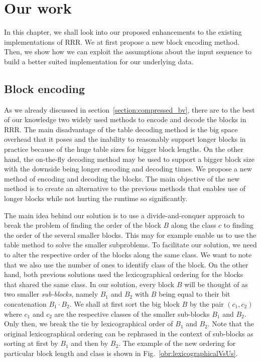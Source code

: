 \chapter{Our work}
\label{kap:kap3}

In this chapter, we shall look into our proposed enhancements to the existing
implementations of RRR. We at first propose a new block encoding method.
Then, we show how we can exploit the assumptions about the input sequence to
build a better suited implementation for our underlying data. 

\section{Block encoding}

As we already discussed in section~\ref{section:compressed_bv}, there are to
the best of our knowledge two widely used methods to encode and decode the
blocks in RRR. The main disadvantage of the table decoding method is the big space
overhead that it poses and the inability to reasonably support longer blocks
in practice because of the huge table sizes for bigger block lengths. On the
other hand, the on-the-fly decoding method may be used to support a bigger block size
with the downside being longer encoding and decoding times. We propose a
new method of encoding and decoding the blocks. The main objective of the new method is
to create an alternative to the previous methods that enables use of longer blocks
while not hurting the runtime so significantly.

The main idea behind our solution is to use a divide-and-conquer approach to break
the problem of finding the order of the block $B$ along the class $c$ to finding the order
of the several smaller blocks. This may for example enable us to use the table method to solve the
smaller subproblems. To facilitate our solution, we need to alter the respective order of
the blocks along the same class. We want to note that we also use the number of ones to
identify class of the block. On the other hand, both previous solutions used the lexicographical ordering
for the blocks that shared the same class. In our solution, every block $B$ will be thought
of as two smaller \textit{sub-blocks}, namely $B_1$ and $B_2$ with $B$ being equal to their bit
concatenation $B_1\cdot B_2$. We shall at first sort the big block $B$ by the pair $(c_1, c_2)$
where $c_1$ and $c_2$ are the respective classes of the smaller sub-blocks $B_1$ and $B_2$. Only then,
we break the tie by lexicographical order of $B_1$ and $B_2$. Note that the original lexicographical
ordering can be rephrased in the context of sub-blocks as sorting at first by $B_1$ and then by
$B_2$. The example of the new ordering for particular block length and class is shown in
Fig.~\ref{obr:lexicographicalVsUs}.

